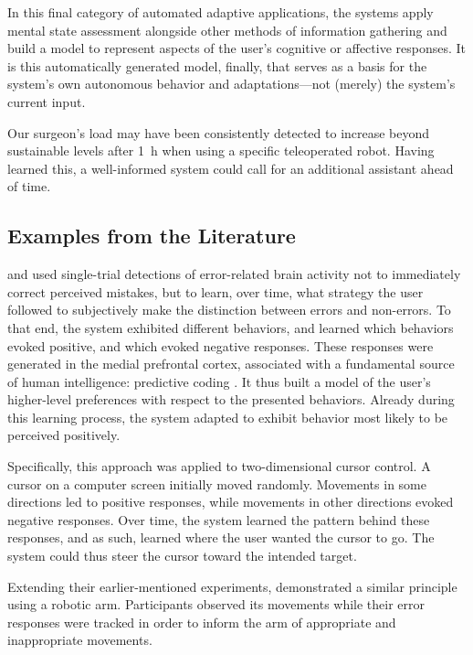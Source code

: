 In this final category of automated adaptive applications, the systems apply mental state assessment alongside other methods of information gathering and build a model to represent aspects of the user's cognitive or affective responses. It is this automatically generated model, finally, that serves as a basis for the system's own autonomous behavior and adaptations---not (merely) the system's current input.

Our surgeon's load may have been consistently detected to increase beyond sustainable levels after 1~h when using a specific teleoperated robot. Having learned this, a well-informed system could call for an additional assistant ahead of time.


\subsection{Examples from the Literature}

 and  used single-trial detections of error-related brain activity not to immediately correct perceived mistakes, but to learn, over time, what strategy the user followed to subjectively make the distinction between errors and non-errors. To that end, the system exhibited different behaviors, and learned which behaviors evoked positive, and which evoked negative responses. These responses were generated in the medial prefrontal cortex, associated with a fundamental source of human intelligence: predictive coding \cite{hawkins2004intelligence}. It thus built a model of the user's higher-level preferences with respect to the presented behaviors. Already during this learning process, the system adapted to exhibit behavior most likely to be perceived positively. 

Specifically, this approach was applied to two-dimensional cursor control. A cursor on a computer screen initially moved randomly. Movements in some directions led to positive responses, while movements in other directions evoked negative responses. Over time, the system learned the pattern behind these responses, and as such, learned where the user wanted the cursor to go. The system could thus steer the cursor toward the intended target. 

Extending their earlier-mentioned experiments,  demonstrated a similar principle using a robotic arm. Participants observed its movements while their error responses were tracked in order to inform the arm of appropriate and inappropriate movements.


